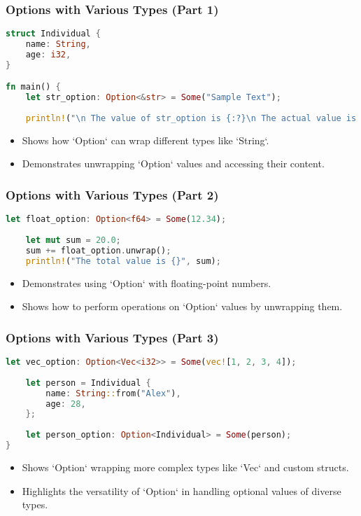 \documentclass[aspectratio=169, table]{beamer}
\begin{document}
\begin{frame}[fragile]
\frametitle{Options with Various Types (Part 1)}
\begin{lstlisting}[language=Rust]
struct Individual {
	name: String,
	age: i32,
}

fn main() {
	let str_option: Option<&str> = Some("Sample Text");
	
	println!("\n The value of str_option is {:?}\n The actual value is {:?} \n\n", str_option, str_option.unwrap());
\end{lstlisting}
\begin{itemize}
	\item Shows how `Option` can wrap different types like `String`.
	\item Demonstrates unwrapping `Option` values and accessing their content.
\end{itemize}
\end{frame}

\begin{frame}[fragile]
\frametitle{Options with Various Types (Part 2)}
\begin{lstlisting}[language=Rust]
	let float_option: Option<f64> = Some(12.34);
	
	let mut sum = 20.0;
	sum += float_option.unwrap();
	println!("The total value is {}", sum);
\end{lstlisting}
\begin{itemize}
	\item Demonstrates using `Option` with floating-point numbers.
	\item Shows how to perform operations on `Option` values by unwrapping them.
\end{itemize}
\end{frame}

\begin{frame}[fragile]
\frametitle{Options with Various Types (Part 3)}
\begin{lstlisting}[language=Rust]
	let vec_option: Option<Vec<i32>> = Some(vec![1, 2, 3, 4]);
	
	let person = Individual {
		name: String::from("Alex"),
		age: 28,
	};
	
	let person_option: Option<Individual> = Some(person);
}
\end{lstlisting}
\begin{itemize}
\item Shows `Option` wrapping more complex types like `Vec` and custom structs.
\item Highlights the versatility of `Option` in handling optional values of diverse types.
\end{itemize}
\end{frame}
\end{document}
